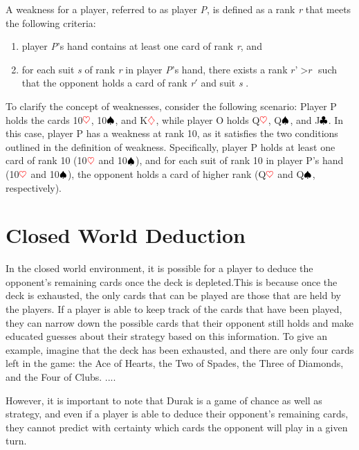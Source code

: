 A weakness for a player, referred to as player \textit{P}, is defined as a rank \textit{r} that meets the following criteria: 
\begin{enumerate}
	\item player \textit{P}'s hand contains at least one card of rank \textit{r}, and
	\item for each suit \textit{s} of rank \textit{r} in player \textit{P}'s hand, there exists a rank $\textit{r}$'$ > \textit{r}$ such that the opponent holds a card of rank \textit{r}$'$ and suit \textit{s} \citep{Bonnet2016TheCO}.
\end{enumerate}

To clarify the concept of weaknesses, consider the following scenario: Player P holds the cards 10$\textcolor{red}{\heartsuit}$, 10$\textcolor{black}{\spadesuit}$, and K$\textcolor{red}{\diamondsuit}$, while player O holds Q$\textcolor{red}{\heartsuit}$, Q$\textcolor{black}{\spadesuit}$, and J$\textcolor{black}{\clubsuit}$. In this case, player P has a weakness at rank 10, as it satisfies the two conditions outlined in the definition of weakness. Specifically, player P holds at least one card of rank 10 (10$\textcolor{red}{\heartsuit}$ and 10$\textcolor{black}{\spadesuit}$), and for each suit of rank 10 in player P's hand (10$\textcolor{red}{\heartsuit}$ and 10$\textcolor{black}{\spadesuit}$), the opponent holds a card of higher rank (Q$\textcolor{red}{\heartsuit}$ and Q$\textcolor{black}{\spadesuit}$, respectively).

\section{Closed World Deduction}

In the closed world environment, it is possible for a player to deduce the opponent's remaining cards once the deck is depleted.This is because once the deck is exhausted, the only cards that can be played are those that are held by the players. If a player is able to keep track of the cards that have been played, they can narrow down the possible cards that their opponent still holds and make educated guesses about their strategy based on this information. To give an example, imagine that the deck has been exhausted, and there are only four cards left in the game: the Ace of Hearts, the Two of Spades, the Three of Diamonds, and the Four of Clubs. ....

However, it is important to note that Durak is a game of chance as well as strategy, and even if a player is able to deduce their opponent's remaining cards, they cannot predict with certainty which cards the opponent will play in a given turn. 
